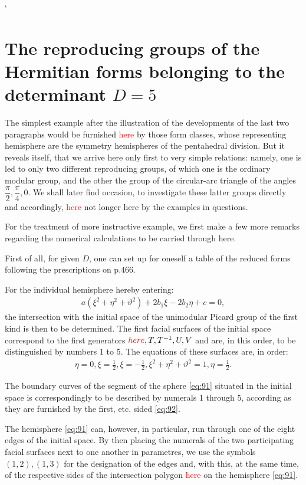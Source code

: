 `\section{The reproducing groups of the Hermitian forms belonging to the determinant $D=5$}

The simplest example after the illustration of the developments of the last two paragraphs would be furnished \textcolor{red}{here} by those form classes, whose representing hemisphere are the symmetry hemispheres of the pentahedral division. But it reveals itself, that we arrive here only first to very simple relations: namely, one is led to only two different reproducing groups, of which one is the ordinary modular group, and the other the group of the circular-arc triangle of the angles $\dfrac{\pi}{2}, \dfrac{\pi}{4}, 0$. We shall later find occasion, to investigate these latter groups directly and accordingly, \textcolor{red}{here} not longer here by the examples in questions.

For the treatment of more instructive example, we first make a few more remarks regarding the numerical calculations to be carried through here.

First of all, for given $D$, one can set up for oneself a table of the reduced forms following the prescriptions on p.466.

For the individual hemisphere hereby entering:
\begin{align}\label{eq:91}
    a(\xi^2+\eta^2+\vartheta^2)+2b_1\xi-2b_2\eta+c=0,
\end{align}
the intersection with the initial space of the unimodular Picard group of the first kind is then to be determined. The first facial surfaces of the initial space correspond to the first generators $\textcolor{red}{here}, T, T^{-1},U,V$ and are, in this order, to be distinguished by numbers $\mathrm{1}$ to 5. The equations of these surfaces are, in order:
\begin{align}\label{eq:92}
    \eta=0, \xi=\frac{1}{2}, \xi=-\frac{1}{2}, \xi^2+\eta^2+\vartheta^2=1, \eta=\frac{1}{2}.
\end{align}

The boundary curves of the segment of the sphere \ref{eq:91} situated in the initial space is correspondingly to be described by numerals 1 through 5, according as they are furnished by the first, etc. sided \ref{eq:92}.

The hemisphere \ref{eq:91} can, however, in particular, run through one of the eight edges of the initial space. By then placing the numerals of the two participating facial surfaces next to one another in parametres, we use the symbols $(1,2), (1,3)$ for the designation of the edges and, with this, at the same time, of the respective sides of the intersection polygon \textcolor{red}{here} on the hemisphere \ref{eq:91}.

